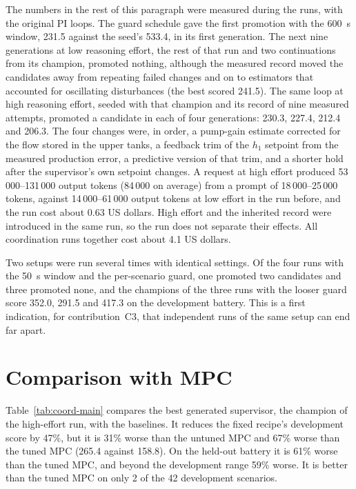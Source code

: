 The numbers in the rest of this paragraph were measured during the runs,
with the original PI loops. The guard schedule gave the first promotion with
the 600~s window, 231.5 against the seed's 533.4, in its first generation.
The next nine generations at low reasoning effort, the rest of that run and
two continuations from its champion, promoted nothing, although the measured
record moved the candidates away from repeating failed changes and on to
estimators that accounted for oscillating disturbances (the best scored
241.5). The same loop at high reasoning effort, seeded with that champion
and its record of nine measured attempts, promoted a candidate in each of
four generations: 230.3, 227.4, 212.4 and 206.3. The four changes were, in
order, a pump-gain estimate corrected for the flow stored in the upper tanks,
a feedback trim of the $h_1$ setpoint from the measured production error, a
predictive version of that trim, and a shorter hold after the supervisor's
own setpoint changes. A request at high effort produced 53\,000--131\,000
output tokens (84\,000 on average) from a prompt of 18\,000--25\,000 tokens,
against 14\,000--61\,000 output tokens at low effort in the run before, and the run cost about
0.63 US dollars. High effort and the inherited record were introduced in the
same run, so the run does not separate their effects. All coordination runs
together cost about 4.1 US dollars.

Two setups were run several times with identical settings. Of the four
runs with the 50~s window and the per-scenario guard, one promoted two
candidates and three promoted none, and the champions of the three runs with
the looser guard score 352.0, 291.5 and 417.3 on the development battery.
This is a first indication, for contribution~C3, that independent runs of the
same setup can end far apart.

\section{Comparison with MPC}
\label{sec:coord-results}
Table~\ref{tab:coord-main} compares the best generated supervisor, the
champion of the high-effort run, with the baselines. It reduces the fixed
recipe's development score by 47\%, but it is 31\% worse than the untuned MPC
and 67\% worse than the tuned MPC (265.4 against 158.8). On the held-out
battery it is 61\% worse than the tuned MPC, and beyond the development range
59\% worse. It is better than the tuned MPC on only 2 of the 42 development
scenarios.

